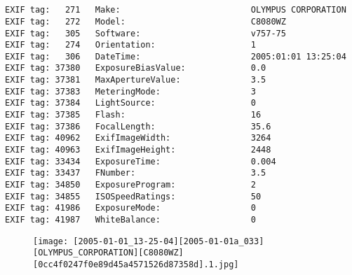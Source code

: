 \section{\protect{}}
\noindent 
\noindent
\begin{lstlisting}
EXIF tag:   271   Make:                          OLYMPUS CORPORATION
EXIF tag:   272   Model:                         C8080WZ
EXIF tag:   305   Software:                      v757-75
EXIF tag:   274   Orientation:                   1
EXIF tag:   306   DateTime:                      2005:01:01 13:25:04
EXIF tag: 37380   ExposureBiasValue:             0.0
EXIF tag: 37381   MaxApertureValue:              3.5
EXIF tag: 37383   MeteringMode:                  3
EXIF tag: 37384   LightSource:                   0
EXIF tag: 37385   Flash:                         16
EXIF tag: 37386   FocalLength:                   35.6
EXIF tag: 40962   ExifImageWidth:                3264
EXIF tag: 40963   ExifImageHeight:               2448
EXIF tag: 33434   ExposureTime:                  0.004
EXIF tag: 33437   FNumber:                       3.5
EXIF tag: 34850   ExposureProgram:               2
EXIF tag: 34855   ISOSpeedRatings:               50
EXIF tag: 41986   ExposureMode:                  0
EXIF tag: 41987   WhiteBalance:                  0

\end{lstlisting}
\clearpage
\begin{figure}
\raggedleft
\texttt{[image: [2005-01-01\_13-25-04][2005-01-01a\_033][OLYMPUS\_CORPORATION][C8080WZ][0cc4f0247f0e89d45a4571526d87358d].1.jpg]}
\end{figure}


\clearpage
